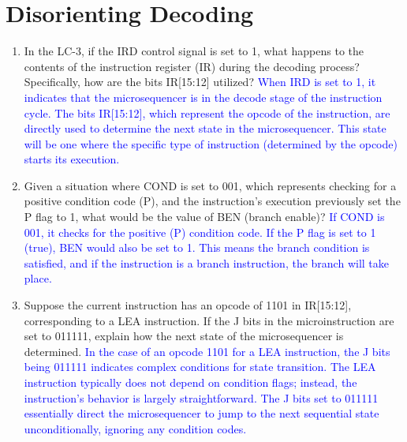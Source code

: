 \documentclass{article}
\begin{document}
    \newpage
    
    \section{Disorienting Decoding}
    \begin{enumerate}[label=(\alph*), itemsep = 50pt]
        \item In the LC-3, if the IRD control signal is set to 1, what happens to the contents of the instruction register (IR) during the decoding process? Specifically, how are the bits IR[15:12] utilized?
        \newline \newline \textcolor{blue} {When IRD is set to 1, it indicates that the microsequencer is in the decode stage of the instruction cycle. The bits IR[15:12], which represent the opcode of the instruction, are directly used to determine the next state in the microsequencer. This state will be one where the specific type of instruction (determined by the opcode) starts its execution.}
        \item Given a situation where COND is set to 001, which represents checking for a positive condition code (P), and the instruction’s execution previously set the P flag to 1, what would be the value of BEN (branch enable)?
        \newline \newline \textcolor{blue} {If COND is 001, it checks for the positive (P) condition code. If the P flag is set to 1 (true), BEN would also be set to 1. This means the branch condition is satisfied, and if the instruction is a branch instruction, the branch will take place.}
        \item Suppose the current instruction has an opcode of 1101 in IR[15:12], corresponding to a LEA instruction. If the J bits in the microinstruction are set to 011111, explain how the next state of the microsequencer is determined.
        \newline \newline \textcolor{blue} {In the case of an opcode 1101 for a LEA instruction, the J bits being 011111 indicates complex conditions for state transition. The LEA instruction typically does not depend on condition flags; instead, the instruction’s behavior is largely straightforward. The J bits set to 011111 essentially direct the microsequencer to jump to the next sequential state unconditionally, ignoring any condition codes.}
        \vspace{2cm}
        \begin{figure}[ht]

\end{figure}
\end{enumerate}
\end{document}
